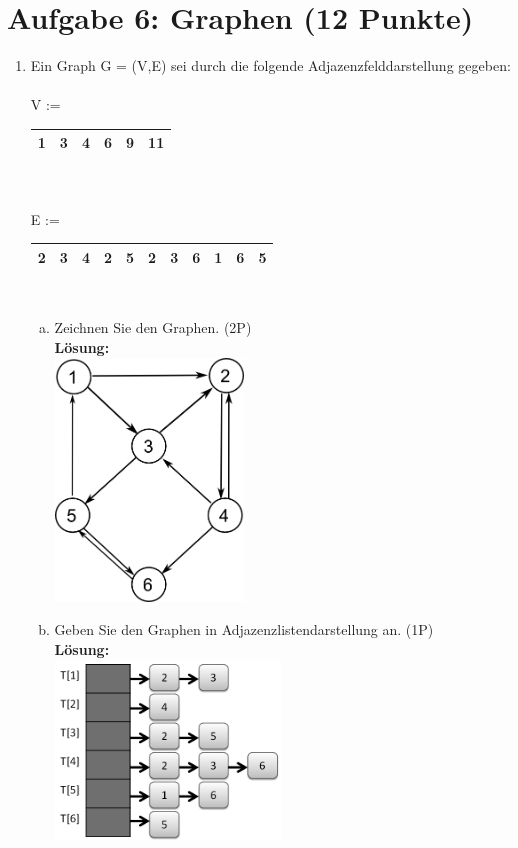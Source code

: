 \documentclass{scrartcl}
\begin{document}
\pagebreak
\section*{Aufgabe 6: Graphen (12 Punkte)}
\begin{enumerate}[(1)]
\item Ein Graph G = (V,E) sei durch die folgende Adjazenzfelddarstellung gegeben:\\
\ \\
V := \begin{tabular}{|c|c|c|c|c|c|}
\hline 
1 & 3 & 4 & 6 & 9 & 11 \\ 
\hline 
\end{tabular}  \\
\ \\
E := \begin{tabular}{|c|c|c|c|c|c|c|c|c|c|c|}
\hline 
2 & 3 & 4 & 2 & 5 & 2 & 3 & 6 & 1 & 6 & 5 \\ 
\hline 
\end{tabular}\\
\begin{enumerate}[(a)]
	\item Zeichnen Sie den Graphen. (2P)\\
	\textbf{Lösung:}\\
	\includegraphics[width=5cm]{images/Graphdarstellungsaufgabe}
	\item Geben Sie den Graphen in Adjazenzlistendarstellung an. (1P)\\
	\textbf{Lösung:}\\
	\includegraphics[width=6cm]{images/AdjazenzlisteSW}

\end{enumerate}
\end{enumerate}
\end{document}
